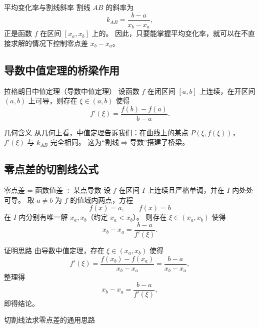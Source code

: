\documentclass[a4paper,11pt]{ctexart}
\begin{document}
\begin{notebox}{平均变化率与割线斜率}
割线 $AB$ 的斜率为
\[
k_{AB} = \frac{b-a}{x_b-x_a},
\]
正是函数 $f$ 在区间 $[x_a,x_b]$ 上的。
因此，只要能掌握平均变化率，就可以在不直接求解的情况下控制零点差 $x_b-x_a$。
\end{notebox}

\subsection{导数中值定理的桥梁作用}

\begin{theorembox}{拉格朗日中值定理（导数中值定理）}
设函数 $f$ 在闭区间 $[a,b]$ 上连续，在开区间 $(a,b)$ 上可导，则存在 $\xi\in(a,b)$ 使得
\[
f'(\xi) = \frac{f(b)-f(a)}{b-a}.
\]
\end{theorembox}

\begin{proofbox}{几何含义}
从几何上看，中值定理告诉我们：在曲线上的某点 $P(\xi,f(\xi))$， $f'(\xi)$ 与 $k_{AB}$ 完全相同。
这为“割线$\Rightarrow$导数”搭建了桥梁。
\end{proofbox}

\subsection{零点差的切割线公式}

\begin{theorembox}{零点差 = 函数值差 $\div$ 某点导数}
设 $f$ 在区间 $I$ 上连续且严格单调，并在 $I$ 内处处可导。
取 $a\neq b$ 为 $f$ 的值域内两点，方程
\[
f(x)=a,\qquad f(x)=b
\]
在 $I$ 内分别有唯一解 $x_a,x_b$（约定 $x_a < x_b$）。
则存在 $\xi\in(x_a,x_b)$ 使得
\[
x_b - x_a = \frac{b-a}{f'(\xi)}.
\]
\end{theorembox}

\begin{proofbox}{证明思路}
由导数中值定理，存在 $\xi\in(x_a,x_b)$ 使得
\[
f'(\xi) = \frac{f(x_b)-f(x_a)}{x_b-x_a} = \frac{b-a}{x_b-x_a},
\]
整理得
\[
x_b-x_a = \frac{b-a}{f'(\xi)},
\]
即得结论。
\end{proofbox}

\begin{summarybox}{切割线法求零点差的通用思路}
\begin{roadmap}
\end{roadmap}
\end{summarybox}
\end{document}
